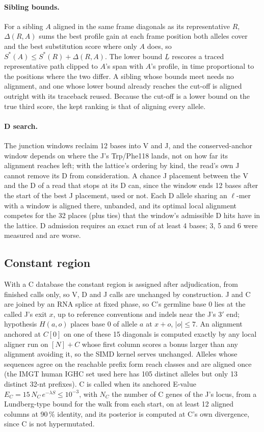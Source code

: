 \documentclass[11pt,a4paper]{article}
\begin{document}
\paragraph{Sibling bounds.} For a sibling $A$ aligned in the same frame
diagonals as its representative $R$, $\Delta(R,A)$ sums the best profile gain
at each frame position both alleles cover and the best substitution score
where only $A$ does, so $S^{*}(A)\le S^{*}(R)+\Delta(R,A)$. The lower bound
$\underline{L}$ rescores a traced representative path clipped to $A$'s span
with $A$'s profile, in time proportional to the positions where the two
differ. A sibling whose bounds meet needs no alignment, and one whose lower
bound already reaches the cut-off is aligned outright with its traceback
reused. Because the cut-off is a lower bound on the true third score, the
kept ranking is that of aligning every allele.

\paragraph{D search.} The junction windows reclaim 12 bases into V and J,
and the conserved-anchor window depends on where the J's Trp/Phe118 lands,
not on how far its alignment reaches left; with the lattice's ordering by
kind, the read's own J cannot remove its D from consideration. A chance J
placement between the V and the D of a read that stops at its D can, since
the window ends 12 bases after the start of the best J placement, used or
not. Each D
allele sharing an $\ell$-mer with a window is aligned there, unbanded, and
its optimal local alignment competes for the 32 places (plus ties) that the
window's admissible D hits have in the lattice. D admission requires an
exact run of at least 4 bases; 3, 5 and 6 were measured and are worse.

\subsection{Constant region}
\label{sec:constant}

With a C database the constant region is assigned after adjudication, from
finished calls only, so V, D and J calls are unchanged by construction. J and
C are joined by an RNA splice at fixed phase, so C's germline base 0 lies at
the called J's exit $x$, up to reference conventions and indels near the J's
3$'$ end; hypothesis $H(a,o)$ places base 0 of allele $a$ at $x+o$,
$|o|\le 7$. An alignment anchored at $C[0]$ on one of these 15 diagonals is
computed exactly by any local aligner run on $[N]+C$ whose first column
scores a bonus larger than any alignment avoiding it, so the SIMD kernel
serves unchanged. Alleles whose sequences agree on the reachable prefix form
reach classes and are aligned once (the IMGT human IGHC set used here has 105
distinct alleles but only 13 distinct 32-nt prefixes). C is called when its
anchored E-value $E_C=15\,N_C\,e^{-\lambda S}\le 10^{-3}$, with $N_C$ the
number of C genes of the J's locus, from a Lundberg-type bound for the
walk from each start, on at least 12 aligned columns at 90\,\% identity, and
its posterior is computed at C's own divergence, since C is not
hypermutated.
\end{document}
